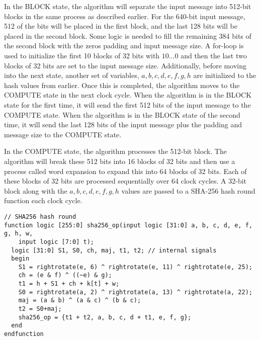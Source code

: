 \documentclass{article}
\begin{document}
In the BLOCK state, the algorithm will separate the input message into 512-bit blocks in the same process as described earlier. For the 640-bit input message, 512 of the bits will be placed in the first block, and the last 128 bits will be placed in the second block. Some logic is needed to fill the remaining 384 bits of the second block with the zeros padding and input message size. A for-loop is used to initialize the first 10 blocks of 32 bits with $10\dots0$ and then the last two blocks of 32 bits are set to the input message size. Additionally, before moving into the next state, another set of variables, $a,b,c,d,e,f,g,h$ are initialized to the hash values from earlier. Once this is completed, the algorithm moves to the COMPUTE state in the next clock cycle. When the algorithm is in the BLOCK state for the first time, it will send the first 512 bits of the input message to the COMPUTE state. When the algorithm is in the BLOCK state of the second time, it will send the last 128 bits of the input message plus the padding and message size to the COMPUTE state.

In the COMPUTE state, the algorithm processes the 512-bit block. The algorithm will break these 512 bits into 16 blocks of 32 bits and then use a process called word expansion to expand this into 64 blocks of 32 bits. Each of these blocks of 32 bits are processed sequentially over 64 clock cycles. A 32-bit block along with the $a,b,c,d,e,f,g,h$ values are passed to a SHA-256 hash round function each clock cycle.

\begin{lstlisting}[style=verilog-style]
// SHA256 hash round
function logic [255:0] sha256_op(input logic [31:0] a, b, c, d, e, f, g, h, w,
    input logic [7:0] t);
  logic [31:0] S1, S0, ch, maj, t1, t2; // internal signals
  begin
    S1 = rightrotate(e, 6) ^ rightrotate(e, 11) ^ rightrotate(e, 25);
    ch = (e & f) ^ ((~e) & g);
    t1 = h + S1 + ch + k[t] + w;
    S0 = rightrotate(a, 2) ^ rightrotate(a, 13) ^ rightrotate(a, 22);
    maj = (a & b) ^ (a & c) ^ (b & c);
    t2 = S0+maj;
    sha256_op = {t1 + t2, a, b, c, d + t1, e, f, g};
  end
endfunction
\end{lstlisting}
\end{document}

